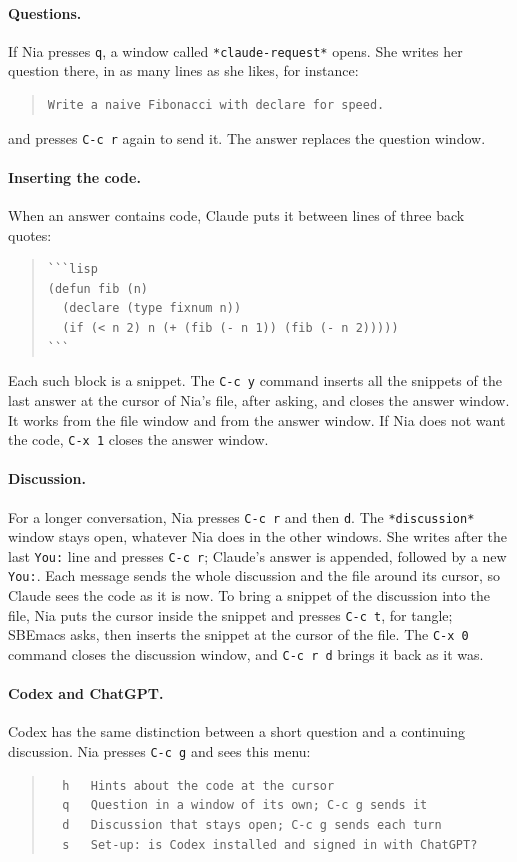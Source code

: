 \documentclass[a4paper,12pt,openany]{book}
\begin{document}
\paragraph{Questions.} If Nia presses \verb|q|, a window called
\verb|*claude-request*| opens. She writes her question there, in as
many lines as she likes, for instance:
\begin{quote}
\begin{verbatim}
Write a naive Fibonacci with declare for speed.
\end{verbatim}
\end{quote}
and presses \verb|C-c r| again to send it. The answer replaces the
question window.

\paragraph{Inserting the code.} When an answer contains code, Claude
puts it between lines of three back quotes:
\begin{quote}
\begin{verbatim}
```lisp
(defun fib (n)
  (declare (type fixnum n))
  (if (< n 2) n (+ (fib (- n 1)) (fib (- n 2)))))
```
\end{verbatim}
\end{quote}
Each such block is a snippet. The \verb|C-c y| command inserts all
the snippets of the last answer at the cursor of Nia's file, after
asking, and closes the answer window. It works from the file
window and from the answer window. If Nia does not want the code,
\verb|C-x 1| closes the answer window.

\paragraph{Discussion.} For a longer conversation, Nia presses
\verb|C-c r| and then \verb|d|. The \verb|*discussion*| window stays
open, whatever Nia does in the other windows. She writes after the
last \verb|You:| line and presses \verb|C-c r|; Claude's answer is
appended, followed by a new \verb|You:|. Each message sends the whole
discussion and the file around its cursor, so Claude sees the code as
it is now. To bring a snippet of the discussion into the file, Nia
puts the cursor inside the snippet and presses \verb|C-c t|, for
tangle; SBEmacs asks, then inserts the snippet at the cursor of the
file. The \verb|C-x 0| command closes the discussion window, and
\verb|C-c r d| brings it back as it was.

\paragraph{Codex and ChatGPT.} Codex has the same distinction between a
short question and a continuing discussion. Nia presses \verb|C-c g| and
sees this menu:
\begin{quote}
\begin{verbatim}
  h   Hints about the code at the cursor
  q   Question in a window of its own; C-c g sends it
  d   Discussion that stays open; C-c g sends each turn
  s   Set-up: is Codex installed and signed in with ChatGPT?
\end{verbatim}
\end{quote}
\end{document}

